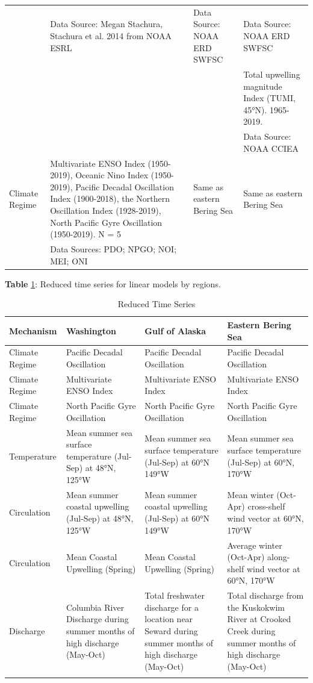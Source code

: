 \documentclass [11pt, proquest] {uwthesis}[2015/03/03]
\begin{document}
\begin{landscape}
\begin{longtable}[t]{l>{\raggedright\arraybackslash}p{20em}>{\raggedright\arraybackslash}p{20em}>{\raggedright\arraybackslash}p{20em}}
\addlinespace
 & Data Source: Megan Stachura, Stachura et al. 2014 from NOAA ESRL & Data Source: NOAA ERD SWFSC & Data Source: NOAA ERD SWFSC\\
 &  &  & Total upwelling magnitude Index (TUMI, 45°N). 1965-2019.\\
 &  &  & Data Source: NOAA CCIEA\\
Climate Regime & Multivariate ENSO Index (1950-2019), Oceanic Nino Index (1950-2019), Pacific Decadal Oscillation Index (1900-2018), the Northern Oscillation Index (1928-2019), North Pacific Gyre Oscillation (1950-2019). N = 5 & Same as eastern Bering Sea & Same as eastern Bering Sea\\
 & Data Sources: PDO; NPGO; NOI; MEI; ONI &  & \\
\bottomrule
\end{longtable}
\endgroup{}
\end{landscape}
\textbf{Table} \ref{tab:reduced}: Reduced time series for linear models
by regions.

\begingroup\fontsize{8}{10}\selectfont
\begin{longtable}[t]{l>{\raggedright\arraybackslash}p{15em}>{\raggedright\arraybackslash}p{15em}>{\raggedright\arraybackslash}p{15em}}
\caption{\label{tab:reduced}Reduced Time Series}\\
\toprule
Mechanism & Washington & Gulf of Alaska & Eastern Bering Sea\\
\midrule
Climate Regime & Pacific Decadal Oscillation & Pacific Decadal Oscillation & Pacific Decadal Oscillation\\
Climate Regime & Multivariate ENSO Index & Multivariate ENSO Index & Multivariate ENSO Index\\
Climate Regime & North Pacific Gyre Oscillation & North Pacific Gyre Oscillation & North Pacific Gyre Oscillation\\
Temperature & Mean summer sea surface temperature (Jul-Sep) at 48°N, 125°W & Mean summer sea surface temperature (Jul-Sep) at 60°N 149°W & Mean summer sea surface temperature (Jul-Sep) at 60°N, 170°W\\
Circulation & Mean summer coastal upwelling (Jul-Sep) at 48°N, 125°W & Mean summer coastal upwelling (Jul-Sep) at 60°N 149°W & Mean winter (Oct-Apr) cross-shelf wind vector at 60°N, 170°W\\
\addlinespace
Circulation & Mean Coastal Upwelling (Spring) & Mean Coastal Upwelling (Spring) & Average winter (Oct-Apr) along-shelf wind vector at 60°N, 170°W\\
Discharge & Columbia River Discharge during summer months of high discharge (May-Oct) & Total freshwater discharge for a location near Seward during summer months of high discharge (May-Oct) & Total discharge from the Kuskokwim River at Crooked Creek during summer months of high discharge (May-Oct)\\
 &  &  & \\
\bottomrule
\end{longtable}
\endgroup{}
\end{document}
